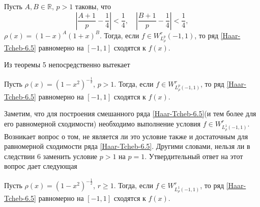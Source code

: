 \begin{theorem}
 Пусть $ A,B\in\mathbb{R},\,p>1$ таковы, что
\begin{equation}\label{Haar-Tcheb-eq7.1}
\left|\frac{A+1}{p}-\frac{1}{4}\right|<\frac{1}{4},\quad
\left|\frac{B+1}{p}-\frac{1}{4}\right|<\frac{1}{4},
\end{equation}
$\rho(x)=(1-x)^A(1+x)^B$. Тогда, если $f\in
W^r_{L_\rho^p}(-1,1)$, то ряд \eqref{Haar-Tcheb-6.5}  равномерно на $[-1,1]$ сходятся к $f(x)$.
\end{theorem}

Из теоремы 5 непосредственно вытекает

\begin{corollary}
 Пусть $\rho(x)=(1-x^2)^{-\frac12}$, $p>1$. Тогда, если $f\in
W^r_{L_\rho^p(-1,1)}$, то ряд \eqref{Haar-Tcheb-6.5}  равномерно на $[-1,1]$ сходятся к $f(x)$.
\end{corollary}

Заметим, что для построения смешанного ряда \eqref{Haar-Tcheb-6.5}(и тем более для его равномерной сходимости) необходимо выполнение условия $f\in W^r_{L_\rho^1(-1,1)}$. Возникает вопрос о том, не является ли это условие также и достаточным для равномерной сходимости ряда \eqref{Haar-Tcheb-6.5}. Другими словами, нельзя ли в следствии 6 заменить   условие $p>1$ на $p=1$. Утвердительный ответ на этот вопрос дает следующая

\begin{theorem}
Пусть $\rho(x)=(1-x^2)^{-\frac12}$, $r\ge1$. Тогда, если $f\in
W^r_{L_\rho^1(-1,1)}$, то ряд \eqref{Haar-Tcheb-6.5}  равномерно на $[-1,1]$ сходятся к $f(x)$.
\end{theorem} 